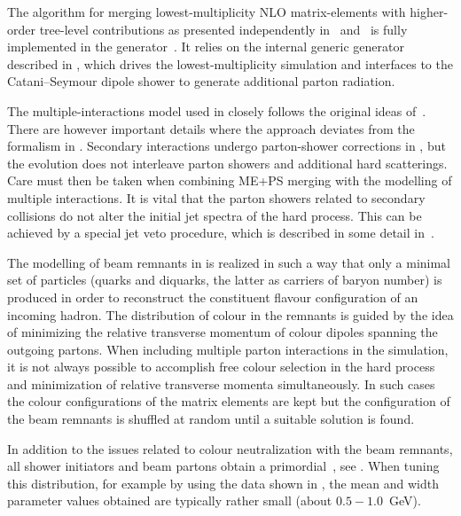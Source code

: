 The \MENLOPS algorithm for merging lowest-multiplicity NLO matrix-elements
with higher-order tree-level contributions as presented independently 
in~\cite{Hamilton:2010wh} and~\cite{Hoeche:2010kg} is fully implemented
in the \Sherpa generator~\cite{Hoeche:2010kg}. It relies on the internal
generic \POWHEG generator described in , 
which drives the lowest-multiplicity simulation and interfaces to the 
Catani--Seymour dipole shower to generate additional parton radiation.

\mcsubsection{\gensectionMPI}
\label{Sec:mpi_sherpa}
The multiple-interactions model used in \Sherpa closely follows the original 
ideas of~\cite{Sjostrand:1987su}. There are however important details where
the approach deviates from the formalism in \Pythia. Secondary interactions 
undergo parton-shower corrections in \Sherpa, but the evolution does not 
interleave parton showers and additional hard scatterings.
Care must then be taken when combining ME+PS merging with the modelling of 
multiple interactions. It is vital that the parton showers related to secondary 
collisions do not alter the initial jet spectra of the hard process. This can 
be achieved by a special jet veto procedure, which is described in some detail
in~\cite{Gleisberg:2008ta}.

The modelling of beam remnants in \Sherpa is realized in such a way that only 
a minimal set of particles (quarks and diquarks, the latter as carriers of 
baryon number) is produced in order to reconstruct the constituent 
flavour configuration of an incoming hadron. The distribution of colour in the 
remnants is guided by the idea of minimizing the relative transverse momentum 
of colour dipoles spanning the outgoing partons.  When including multiple 
parton interactions in the simulation, it is not always possible to accomplish 
free colour selection in the hard process and minimization of relative transverse 
momenta simultaneously.  In such cases the colour configurations of the 
matrix elements are kept but the configuration of the beam remnants is shuffled 
at random until a suitable solution is found.

In addition to the issues related to colour neutralization with the
beam remnants, all shower initiators and beam partons obtain a
primordial~\kt, see . When tuning this
distribution, for example by using the data shown in , 
the mean and width parameter values obtained are typically rather
small (about $0.5-1.0$~GeV).

